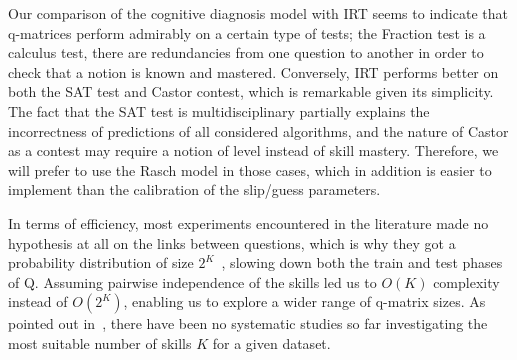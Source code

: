 \documentclass{edm_template}
\newcommand\alert[1]{\textcolor{red}{#1}}
\begin{document}
Our comparison of the cognitive diagnosis model with IRT seems to indicate that q-matrices perform admirably on a certain type of tests; the Fraction test is a calculus test, there are redundancies from one question to another in order to check that a notion is known and mastered. Conversely, IRT performs better on both the SAT test and Castor contest, which is remarkable given its simplicity. The fact that the SAT test is multidisciplinary partially explains the incorrectness of predictions of all considered algorithms, and the nature of Castor as a contest may require a notion of level instead of skill mastery. Therefore, we will prefer to use the Rasch model in those cases, which in addition is easier to implement than the calibration of the slip/guess parameters.

In terms of efficiency, most experiments encountered in the literature made no hypothesis at all on the links between questions, which is why they got a probability distribution of size $2^K$~\cite{Cheng2009, Huebner2010}, slowing down both the train and test phases of Q. Assuming pairwise independence of the skills led us to $O(K)$ complexity instead of $O(2^K)$, enabling us to explore a wider range of q-matrix sizes. As pointed out in~\cite{Huebner2010}, there have been no systematic studies so far investigating the most suitable number of skills $K$ for a given dataset. %




\end{document}
